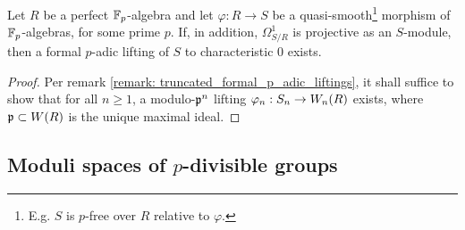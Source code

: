             \begin{proposition} \label{prop: existence_of_lifts_of_quasi_smooth_rings_of_characteristic_p}
                Let $R$ be a perfect $\mathbb{F}_p$-algebra and let $\varphi: R \to S$ be a quasi-smooth\footnote{E.g. $S$ is $p$-free over $R$ relative to $\varphi$.} morphism of $\mathbb{F}_p$-algebras, for some prime $p$. If, in addition, $\Omega^1_{S/R}$ is projective as an $S$-module, then a formal $p$-adic lifting of $S$ to characteristic $0$ exists. 
            \end{proposition}
                \begin{proof}
                    Per remark \ref{remark: truncated_formal_p_adic_liftings}, it shall suffice to show that for all $n \geq 1$, a modulo-$\mathfrak{p}^n$ lifting $\varphi_n: S_n \to W_n(R)$ exists, where $\mathfrak{p} \subset W(R)$ is the unique maximal ideal.
                \end{proof}
            
    
    \subsection{Moduli spaces of \texorpdfstring{$p$}{}-divisible groups}